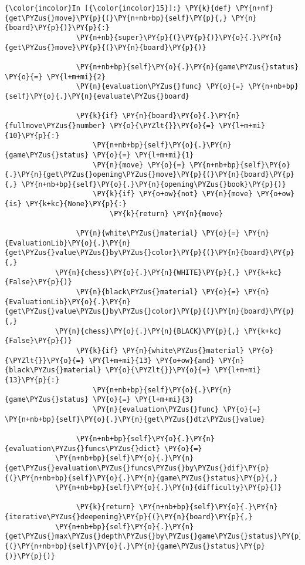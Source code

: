     \begin{Verbatim}[commandchars=\\\{\}]
{\color{incolor}In [{\color{incolor}15}]:} \PY{k}{def} \PY{n+nf}{get\PYZus{}move}\PY{p}{(}\PY{n+nb+bp}{self}\PY{p}{,} \PY{n}{board}\PY{p}{)}\PY{p}{:}
                 \PY{n+nb}{super}\PY{p}{(}\PY{p}{)}\PY{o}{.}\PY{n}{get\PYZus{}move}\PY{p}{(}\PY{n}{board}\PY{p}{)}
         
                 \PY{n+nb+bp}{self}\PY{o}{.}\PY{n}{game\PYZus{}status} \PY{o}{=} \PY{l+m+mi}{2}
                 \PY{n}{evaluation\PYZus{}func} \PY{o}{=} \PY{n+nb+bp}{self}\PY{o}{.}\PY{n}{evaluate\PYZus{}board}
                 
                 \PY{k}{if} \PY{n}{board}\PY{o}{.}\PY{n}{fullmove\PYZus{}number} \PY{o}{\PYZlt{}}\PY{o}{=} \PY{l+m+mi}{10}\PY{p}{:}
                     \PY{n+nb+bp}{self}\PY{o}{.}\PY{n}{game\PYZus{}status} \PY{o}{=} \PY{l+m+mi}{1}
                     \PY{n}{move} \PY{o}{=} \PY{n+nb+bp}{self}\PY{o}{.}\PY{n}{get\PYZus{}opening\PYZus{}move}\PY{p}{(}\PY{n}{board}\PY{p}{,} \PY{n+nb+bp}{self}\PY{o}{.}\PY{n}{opening\PYZus{}book}\PY{p}{)}
                     \PY{k}{if} \PY{o+ow}{not} \PY{n}{move} \PY{o+ow}{is} \PY{k+kc}{None}\PY{p}{:}
                         \PY{k}{return} \PY{n}{move}
                 
                 \PY{n}{white\PYZus{}material} \PY{o}{=} \PY{n}{EvaluationLib}\PY{o}{.}\PY{n}{get\PYZus{}value\PYZus{}by\PYZus{}color}\PY{p}{(}\PY{n}{board}\PY{p}{,} 
			\PY{n}{chess}\PY{o}{.}\PY{n}{WHITE}\PY{p}{,} \PY{k+kc}{False}\PY{p}{)}
                 \PY{n}{black\PYZus{}material} \PY{o}{=} \PY{n}{EvaluationLib}\PY{o}{.}\PY{n}{get\PYZus{}value\PYZus{}by\PYZus{}color}\PY{p}{(}\PY{n}{board}\PY{p}{,} 
			\PY{n}{chess}\PY{o}{.}\PY{n}{BLACK}\PY{p}{,} \PY{k+kc}{False}\PY{p}{)}
                 \PY{k}{if} \PY{n}{white\PYZus{}material} \PY{o}{\PYZlt{}}\PY{o}{=} \PY{l+m+mi}{13} \PY{o+ow}{and} \PY{n}{black\PYZus{}material} \PY{o}{\PYZlt{}}\PY{o}{=} \PY{l+m+mi}{13}\PY{p}{:}
                     \PY{n+nb+bp}{self}\PY{o}{.}\PY{n}{game\PYZus{}status} \PY{o}{=} \PY{l+m+mi}{3}
                     \PY{n}{evaluation\PYZus{}func} \PY{o}{=} \PY{n+nb+bp}{self}\PY{o}{.}\PY{n}{get\PYZus{}dtz\PYZus{}value}
                 
                 \PY{n+nb+bp}{self}\PY{o}{.}\PY{n}{evaluation\PYZus{}funcs\PYZus{}dict} \PY{o}{=} 
			\PY{n+nb+bp}{self}\PY{o}{.}\PY{n}{get\PYZus{}evaluation\PYZus{}funcs\PYZus{}by\PYZus{}dif}\PY{p}{(}\PY{n+nb+bp}{self}\PY{o}{.}\PY{n}{game\PYZus{}status}\PY{p}{,} 
			\PY{n+nb+bp}{self}\PY{o}{.}\PY{n}{difficulty}\PY{p}{)}
         
                 \PY{k}{return} \PY{n+nb+bp}{self}\PY{o}{.}\PY{n}{iterative\PYZus{}deepening}\PY{p}{(}\PY{n}{board}\PY{p}{,} 
			\PY{n+nb+bp}{self}\PY{o}{.}\PY{n}{get\PYZus{}max\PYZus{}depth\PYZus{}by\PYZus{}game\PYZus{}status}\PY{p}{(}\PY{n+nb+bp}{self}\PY{o}{.}\PY{n}{game\PYZus{}status}\PY{p}{)}\PY{p}{)}
\end{Verbatim}

